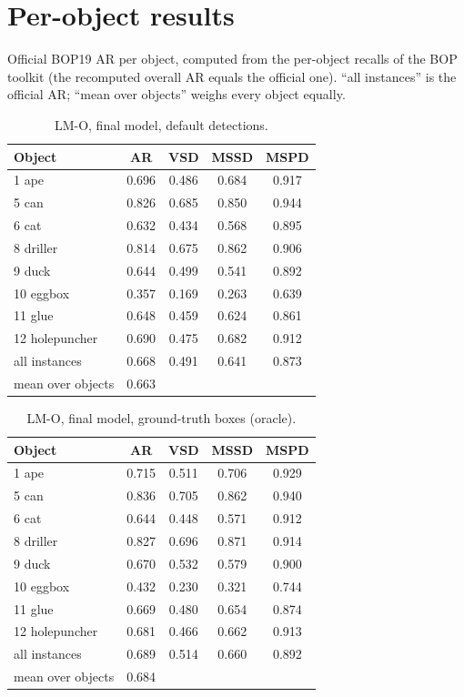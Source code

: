 \section{Per-object results}
\label{sec:supp:perobject}
Official BOP19 AR per object, computed from the per-object recalls of the BOP toolkit (the
recomputed overall AR equals the official one). ``all instances'' is the official AR; ``mean over
objects'' weighs every object equally.

\begin{table}[h]
  \centering
  \footnotesize
  \begin{tabular}{lcccc}
    \toprule
    Object & AR & VSD & MSSD & MSPD \\
    \midrule
1 ape & 0.696 & 0.486 & 0.684 & 0.917 \\
5 can & 0.826 & 0.685 & 0.850 & 0.944 \\
6 cat & 0.632 & 0.434 & 0.568 & 0.895 \\
8 driller & 0.814 & 0.675 & 0.862 & 0.906 \\
9 duck & 0.644 & 0.499 & 0.541 & 0.892 \\
10 eggbox & 0.357 & 0.169 & 0.263 & 0.639 \\
11 glue & 0.648 & 0.459 & 0.624 & 0.861 \\
12 holepuncher & 0.690 & 0.475 & 0.682 & 0.912 \\
\midrule
all instances & 0.668 & 0.491 & 0.641 & 0.873 \\
mean over objects & 0.663 &  &  &  \\
    \bottomrule
  \end{tabular}
  \caption{LM-O, final model, default detections.}
  \label{tab:perobj_lmo}
\end{table}

\begin{table}[h]
  \centering
  \footnotesize
  \begin{tabular}{lcccc}
    \toprule
    Object & AR & VSD & MSSD & MSPD \\
    \midrule
1 ape & 0.715 & 0.511 & 0.706 & 0.929 \\
5 can & 0.836 & 0.705 & 0.862 & 0.940 \\
6 cat & 0.644 & 0.448 & 0.571 & 0.912 \\
8 driller & 0.827 & 0.696 & 0.871 & 0.914 \\
9 duck & 0.670 & 0.532 & 0.579 & 0.900 \\
10 eggbox & 0.432 & 0.230 & 0.321 & 0.744 \\
11 glue & 0.669 & 0.480 & 0.654 & 0.874 \\
12 holepuncher & 0.681 & 0.466 & 0.662 & 0.913 \\
\midrule
all instances & 0.689 & 0.514 & 0.660 & 0.892 \\
mean over objects & 0.684 &  &  &  \\
    \bottomrule
  \end{tabular}
  \caption{LM-O, final model, ground-truth boxes (oracle).}
  \label{tab:perobj_lmo_gt}
\end{table}

